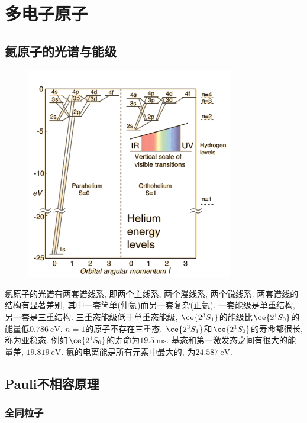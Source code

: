 \documentclass[hidelinks]{ctexart}
\begin{document}
\section{多电子原子} %
\label{sec:多电子原子}

\subsection{氦原子的光谱与能级} %
\label{sub:氦原子的光谱与能级}

\begin{figure}[ht]
    \centering
    \includegraphics[width=9cm]{src/heliumlev.png}
\end{figure}

\newpoint{}氦原子的光谱有两套谱线系, 即两个主线系, 两个漫线系, 两个锐线系. 两套谱线的结构有显著差别, 其中一套简单(仲氦)而另一套复杂(正氦).
\newpoint{}一套能级是单重结构, 另一套是三重结构.
\newpoint{}三重态能级低于单重态能级, $\ce{2 ^3S_{1}}$的能级比$\ce{2 ^1S_{0}}$的能量低$\SI{0.786}{\eV}$.
\newpoint{}$n=1$的原子不存在三重态.
\newpoint{}$\ce{2 ^3S_1}$和$\ce{2 ^1S_0}$的寿命都很长, 称为亚稳态. 例如$\ce{2 ^1S_0}$的寿命为$\SI{19.5}{\milli\second}$.
\newpoint{}基态和第一激发态之间有很大的能量差, $\SI{19.819}{\eV}$. 氦的电离能是所有元素中最大的, 为$\SI{24.587}{\eV}$.


\subsection{Pauli不相容原理} %
\label{sub:pauli不相容原理}

\subsubsection{全同粒子} %
\label{ssub:全同粒子}
\end{document}
